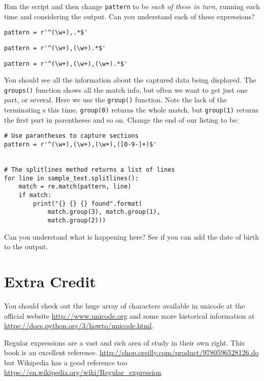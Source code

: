 \documentclass[12pt,oneside]{cttutorial}
\begin{document}
Run the script and then change \lstinline!pattern! to be \emph{each of these in turn}, running each time and considering the output. Can you understand each of these expressions?

\begin{lstlisting}
pattern = r'^(\w+),.*$'
\end{lstlisting}

\begin{lstlisting}
pattern = r'^(\w+),(\w+).*$'
\end{lstlisting}

\begin{lstlisting}
pattern = r'^(\w+),(\w+),(\w+).*$'
\end{lstlisting}

You should see all the information about the captured data being displayed. The \lstinline!groups()! function shows all the match info, but often we want to get just one part, or several. Here we use the \lstinline!group()! function. Note the lack of the terminating s this time. \lstinline!group(0)! returns the whole match, but \lstinline!group(1)! returns the first part in parentheses and so on. Change the end of our listing to be:

\begin{lstlisting}
# Use parantheses to capture sections
pattern = r'^(\w+),(\w+),(\w+),([0-9-]+)$'


# The splitlines method returns a list of lines
for line in sample_text.splitlines():
    match = re.match(pattern, line)
    if match:
        print("{} {} {} found".format(
            match.group(3), match.group(1),
            match.group(2)))
\end{lstlisting}

Can you understand what is happening here? See if you can add the date of birth to the output.


\section{Extra Credit}

You should check out the huge array of characters available in unicode at the official website \url{http://www.unicode.org} and some more historical information at \url{https://docs.python.org/3/howto/unicode.html}.

Regular expressions are a vast and rich area of study in their own right. This book is an excellent reference. \url{http://shop.oreilly.com/product/9780596528126.do} but Wikipedia has a good reference too \url{https://en.wikipedia.org/wiki/Regular_expression}.
\end{document}
